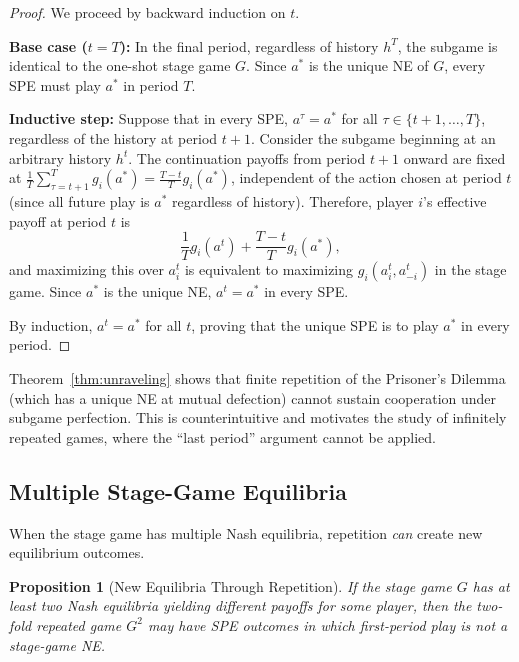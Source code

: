 \documentclass[11pt,a4paper]{article}
\theoremstyle{definition}
\theoremstyle{plain}
\newtheorem{proposition}[theorem]{Proposition}
\theoremstyle{remark}
\begin{document}
\begin{proof}
We proceed by backward induction on $t$.

\textbf{Base case ($t = T$):} In the final period, regardless of history $h^T$, the
subgame is identical to the one-shot stage game $G$. Since $a^*$ is the unique NE of $G$,
every SPE must play $a^*$ in period $T$.

\textbf{Inductive step:} Suppose that in every SPE, $a^{\tau} = a^*$ for all $\tau \in
\{t+1, \ldots, T\}$, regardless of the history at period $t+1$. Consider the subgame
beginning at an arbitrary history $h^t$. The continuation payoffs from period $t+1$ onward
are fixed at $\frac{1}{T}\sum_{\tau=t+1}^{T} g_i(a^*) = \frac{T-t}{T} g_i(a^*)$,
independent of the action chosen at period $t$ (since all future play is $a^*$ regardless
of history). Therefore, player $i$'s effective payoff at period $t$ is
\[
    \frac{1}{T} g_i(a^t) + \frac{T-t}{T} g_i(a^*),
\]
and maximizing this over $a_i^t$ is equivalent to maximizing $g_i(a_i^t, a_{-i}^t)$ in the
stage game. Since $a^*$ is the unique NE, $a^t = a^*$ in every SPE.

By induction, $a^t = a^*$ for all $t$, proving that the unique SPE is to play $a^*$ in
every period.
\end{proof}

\begin{warning}
Theorem~\ref{thm:unraveling} shows that finite repetition of the Prisoner's Dilemma (which
has a unique NE at mutual defection) cannot sustain cooperation under subgame perfection.
This is counterintuitive and motivates the study of infinitely repeated games, where the
``last period'' argument cannot be applied.
\end{warning}

\subsection{Multiple Stage-Game Equilibria}

When the stage game has multiple Nash equilibria, repetition \emph{can} create new
equilibrium outcomes.

\begin{proposition}[New Equilibria Through Repetition]
\label{prop:multiple-ne-repetition}
If the stage game $G$ has at least two Nash equilibria yielding different payoffs for some
player, then the two-fold repeated game $G^2$ may have SPE outcomes in which first-period
play is not a stage-game NE.
\end{proposition}
\end{document}
